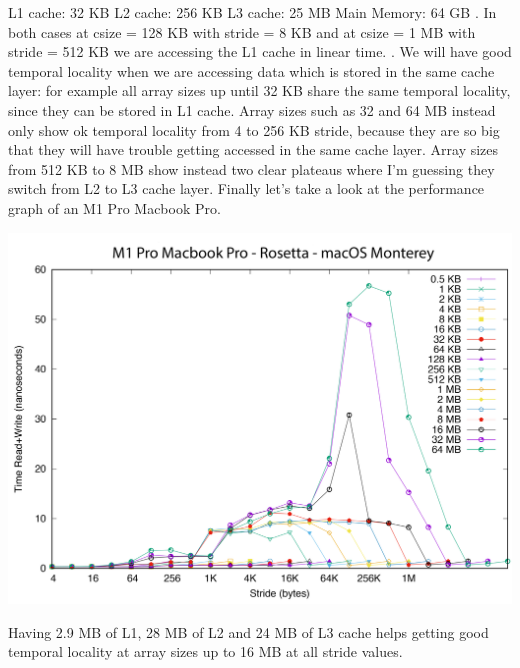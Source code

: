 \documentclass[unicode,11pt,a4paper,oneside,numbers=endperiod,openany]{scrartcl}
\begin{document}
L1 cache: 32 KB
\newline
L2 cache: 256 KB
\newline
L3 cache: 25 MB
\newline
Main Memory: 64 GB
\newline
{}. In both cases at csize = 128 KB with stride = 8 KB and at csize = 1 MB  with stride = 512 KB we are accessing the L1 cache in linear time.
\newline
{}. We will have good temporal locality when we are accessing data which is stored in the same cache layer: for example all array sizes up until 32 KB share the same temporal locality, since they can be stored in L1 cache. Array sizes such as 32 and 64 MB instead only show ok temporal locality from 4 to 256 KB stride, because they are so big that they will have trouble getting accessed in the same cache layer.
\newline
Array sizes from 512 KB to 8 MB show instead two clear plateaus where I'm guessing they switch from L2 to L3 cache layer.
\newline
\newline
Finally let's take a look at the performance graph of an M1 Pro Macbook Pro.
\begin{center}
\includegraphics[width=0.7\linewidth]{gnuplot_local_machine.png}
\end{center}
Having 2.9 MB of L1, 28 MB of L2 and 24 MB of L3 cache helps getting good temporal locality at array sizes up to 16 MB at all stride values.
\end{document}
